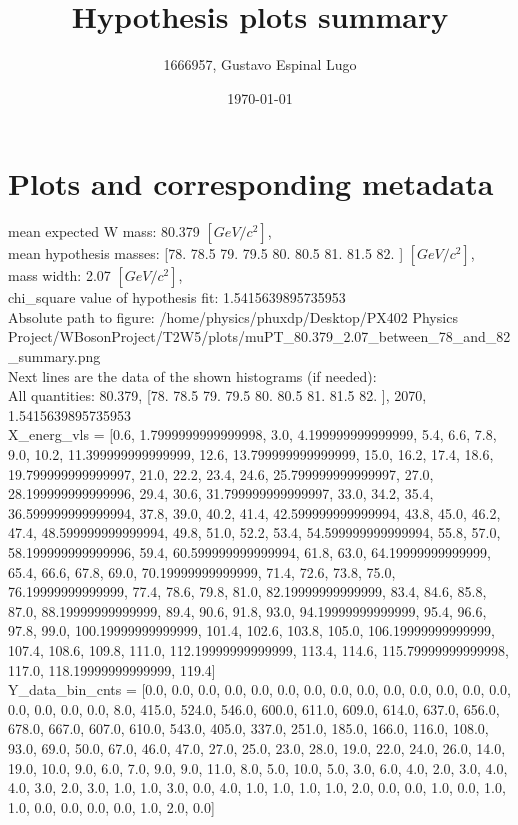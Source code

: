 \documentclass[12pt]{article}
\begin{document}
	\title{Hypothesis plots summary} %
	\author{1666957, Gustavo Espinal Lugo}
	\date{\today} %

	\maketitle
	
	\section*{Plots and corresponding metadata}
	mean expected W mass: 80.379 $[GeV/c^{2}]$,\\
mean hypothesis masses: [78.  78.5 79.  79.5 80.  80.5 81.  81.5 82. ] $[GeV/c^{2}]$,\\
mass width: 2.07 $[GeV/c^{2}]$,\\
chi\_square value of hypothesis fit: 1.5415639895735953\\
	Absolute path to figure: /home/physics/phuxdp/Desktop/PX402 Physics Project/WBosonProject/T2W5/plots/muPT\_80.379\_2.07\_between\_78\_and\_82\_summary.png\\
	Next lines are the data of the shown histograms (if needed): \\
	All quantities: 	80.379, [78.  78.5 79.  79.5 80.  80.5 81.  81.5 82. ], 2070, 1.5415639895735953\\
	X\_energ\_vls = [0.6, 1.7999999999999998, 3.0, 4.199999999999999, 5.4, 6.6, 7.8, 9.0, 10.2, 11.399999999999999, 12.6, 13.799999999999999, 15.0, 16.2, 17.4, 18.6, 19.799999999999997, 21.0, 22.2, 23.4, 24.6, 25.799999999999997, 27.0, 28.199999999999996, 29.4, 30.6, 31.799999999999997, 33.0, 34.2, 35.4, 36.599999999999994, 37.8, 39.0, 40.2, 41.4, 42.599999999999994, 43.8, 45.0, 46.2, 47.4, 48.599999999999994, 49.8, 51.0, 52.2, 53.4, 54.599999999999994, 55.8, 57.0, 58.199999999999996, 59.4, 60.599999999999994, 61.8, 63.0, 64.19999999999999, 65.4, 66.6, 67.8, 69.0, 70.19999999999999, 71.4, 72.6, 73.8, 75.0, 76.19999999999999, 77.4, 78.6, 79.8, 81.0, 82.19999999999999, 83.4, 84.6, 85.8, 87.0, 88.19999999999999, 89.4, 90.6, 91.8, 93.0, 94.19999999999999, 95.4, 96.6, 97.8, 99.0, 100.19999999999999, 101.4, 102.6, 103.8, 105.0, 106.19999999999999, 107.4, 108.6, 109.8, 111.0, 112.19999999999999, 113.4, 114.6, 115.79999999999998, 117.0, 118.19999999999999, 119.4]\\
	Y\_data\_bin\_cnts = [0.0, 0.0, 0.0, 0.0, 0.0, 0.0, 0.0, 0.0, 0.0, 0.0, 0.0, 0.0, 0.0, 0.0, 0.0, 0.0, 0.0, 0.0, 8.0, 415.0, 524.0, 546.0, 600.0, 611.0, 609.0, 614.0, 637.0, 656.0, 678.0, 667.0, 607.0, 610.0, 543.0, 405.0, 337.0, 251.0, 185.0, 166.0, 116.0, 108.0, 93.0, 69.0, 50.0, 67.0, 46.0, 47.0, 27.0, 25.0, 23.0, 28.0, 19.0, 22.0, 24.0, 26.0, 14.0, 19.0, 10.0, 9.0, 6.0, 7.0, 9.0, 9.0, 11.0, 8.0, 5.0, 10.0, 5.0, 3.0, 6.0, 4.0, 2.0, 3.0, 4.0, 4.0, 3.0, 2.0, 3.0, 1.0, 1.0, 3.0, 0.0, 4.0, 1.0, 1.0, 1.0, 1.0, 2.0, 0.0, 0.0, 1.0, 0.0, 1.0, 1.0, 0.0, 0.0, 0.0, 0.0, 1.0, 2.0, 0.0]\\
\end{document}
